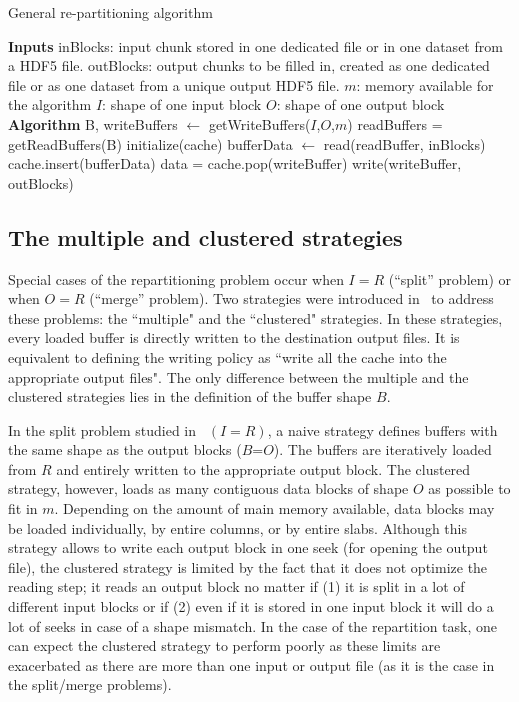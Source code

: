 \documentclass[conference]{IEEEtran}
\begin{document}
\begin{algorithm}
  \caption{General re-partitioning algorithm}
  \label{algo:generalrepartition}
  \begin{algorithmic}[1]
    \STATE \textbf{Inputs}
    \STATE inBlocks: input chunk stored in one dedicated file or in one dataset from a HDF5 file.
    \STATE outBlocks: output chunks to be filled in, created as one dedicated file or as one dataset from a unique output HDF5 file.
    \STATE $m$: memory available for the algorithm
    \STATE $I$: shape of one input block
    \STATE $O$: shape of one output block
    \STATE
    \STATE \textbf{Algorithm}
    \STATE B, writeBuffers $\leftarrow$ getWriteBuffers($I$,$O$,$m$)
    \STATE readBuffers = getReadBuffers(B)
    \STATE initialize(cache)
      \STATE bufferData $\leftarrow$ read(readBuffer, inBlocks)
      \STATE cache.insert(bufferData)
          \STATE data = cache.pop(writeBuffer)
          \STATE write(writeBuffer, outBlocks)
        \ENDIF
      \ENDFOR
    \ENDFOR

  \end{algorithmic}
\end{algorithm}

\subsection{The multiple and clustered strategies}
Special cases of the repartitioning problem occur when $I=R$ (``split'' problem)
or when $O=R$ (``merge'' problem). Two strategies were introduced
in~\cite{seqalgorithms} to address these problems: the ``multiple" and the
``clustered" strategies. In these strategies, every loaded buffer is directly written to the
destination output files. It is equivalent to defining the writing policy
as ``write all the cache into the appropriate output files". The only difference
between the multiple and the clustered strategies lies in the definition of the
buffer shape $B$.

In the split problem studied in~\cite{seqalgorithms} $(I=R)$, a naive
strategy defines buffers with the same shape as the output blocks
($B$=$O$). The buffers are iteratively loaded from $R$ and entirely written
to the appropriate output block. The clustered strategy, however, loads as
many contiguous data blocks of shape $O$ as possible to fit in $m$.
Depending on the amount of main memory available, data blocks may be loaded
individually, by entire columns, or by entire slabs.
Although this strategy allows to write each output block in one seek
(for opening the output file), the clustered strategy is limited by the fact
that it does not optimize the reading step; it reads an output block no matter
if (1) it is split in a lot of different input blocks or if (2) even if it is stored
in one input block it will do a lot of seeks in case of a shape mismatch.
In the case of the repartition task, one can expect the clustered strategy to
perform poorly as these limits are exacerbated as there are more than one input or
output file (as it is the case in the split/merge problems).
\end{document}
